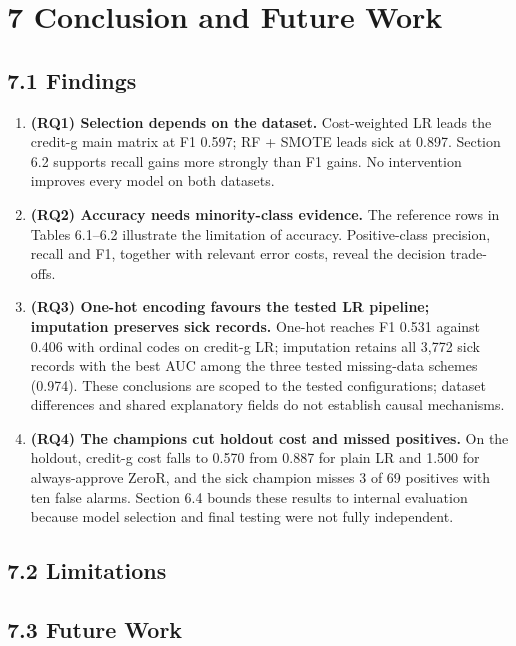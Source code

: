 \setcounter{section}{6}
\section*{7 Conclusion and Future Work}

\subsection*{7.1 Findings}

\begin{enumerate}
\item \textbf{(RQ1) Selection depends on the dataset.} Cost-weighted LR leads the
credit-g main matrix at F1 0.597; RF + SMOTE leads sick at 0.897. Section 6.2 supports
recall gains more strongly than F1 gains. No intervention improves every model on both
datasets.
\item \textbf{(RQ2) Accuracy needs minority-class evidence.} The reference rows in
Tables 6.1--6.2 illustrate the limitation of accuracy. Positive-class precision, recall
and F1, together with relevant error costs, reveal the decision trade-offs.
\item \textbf{(RQ3) One-hot encoding favours the tested LR pipeline; imputation
preserves sick records.} One-hot reaches F1 0.531 against 0.406 with ordinal codes on
credit-g LR; imputation retains all 3{,}772 sick records with the best AUC among the
three tested missing-data schemes (0.974). These conclusions are scoped to the tested
configurations; dataset differences and shared explanatory fields do not establish
causal mechanisms.
\item \textbf{(RQ4) The champions cut holdout cost and missed positives.} On the
holdout, credit-g cost falls to 0.570 from 0.887 for plain LR and 1.500 for
always-approve ZeroR, and the sick champion misses 3 of 69 positives with ten false
alarms. Section 6.4 bounds these results to internal evaluation because model
selection and final testing were not fully independent.
\end{enumerate}


\subsection*{7.2 Limitations}

\subsection*{7.3 Future Work}

